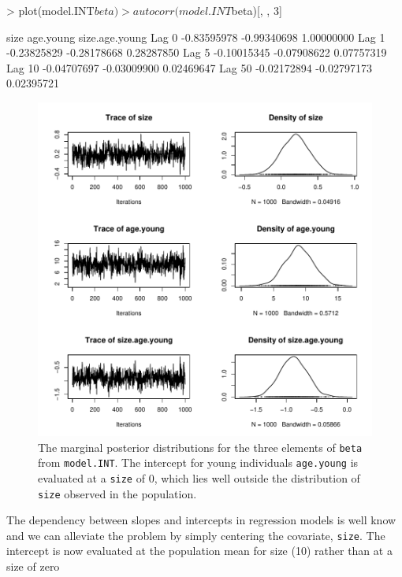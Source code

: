 \documentclass{article}
\begin{document}
\begin{Schunk}
\begin{Sinput}
> plot(model.INT$beta)
> autocorr(model.INT$beta)[, , 3]
\end{Sinput}
\begin{Soutput}
              size   age.young size.age.young
Lag 0  -0.83595978 -0.99340698     1.00000000
Lag 1  -0.23825829 -0.28178668     0.28287850
Lag 5  -0.10015345 -0.07908622     0.07757319
Lag 10 -0.04707697 -0.03009900     0.02469647
Lag 50 -0.02172894 -0.02797173     0.02395721
\end{Soutput}
\end{Schunk}



\begin{figure}[!h]
\begin{center}
\includegraphics{Tutorial-059}
\end{center}
\caption{The marginal posterior distributions for the three elements of \texttt{beta} from \texttt{model.INT}.  The intercept for young individuals \texttt{age.young} is evaluated at a \texttt{size} of 0, which lies well outside the distribution of \texttt{size} observed in the population.}
\label{INT-fig}
\end{figure}

The dependency between slopes and intercepts in regression models is well know and we can alleviate the problem by simply centering the covariate, \texttt{size}.  The intercept is now evaluated at the population mean for size (10) rather than at a size of zero
\end{document}

